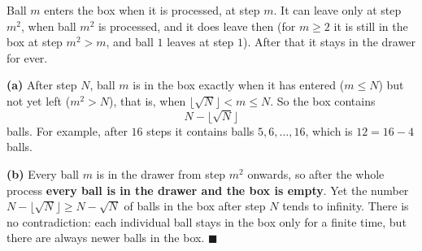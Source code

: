 Ball $m$ enters the box when it is processed, at step $m$. It can leave only at step $m^2$, when ball $m^2$ is processed, and it does leave then (for $m\ge2$ it is still in the box at step $m^2>m$, and ball $1$ leaves at step $1$). After that it stays in the drawer for ever.

\textbf{(a)} After step $N$, ball $m$ is in the box exactly when it has entered ($m\le N$) but not yet left ($m^2>N$), that is, when $\lfloor\sqrt N\rfloor<m\le N$. So the box contains
\[\boxed{N-\lfloor\sqrt N\rfloor}\]
balls. For example, after $16$ steps it contains balls $5,6,\dots,16$, which is $12=16-4$ balls.

\textbf{(b)} Every ball $m$ is in the drawer from step $m^2$ onwards, so after the whole process \textbf{every ball is in the drawer and the box is empty}. Yet the number $N-\lfloor\sqrt N\rfloor\ge N-\sqrt N$ of balls in the box after step $N$ tends to infinity. There is no contradiction: each individual ball stays in the box only for a finite time, but there are always newer balls in the box. $\blacksquare$
